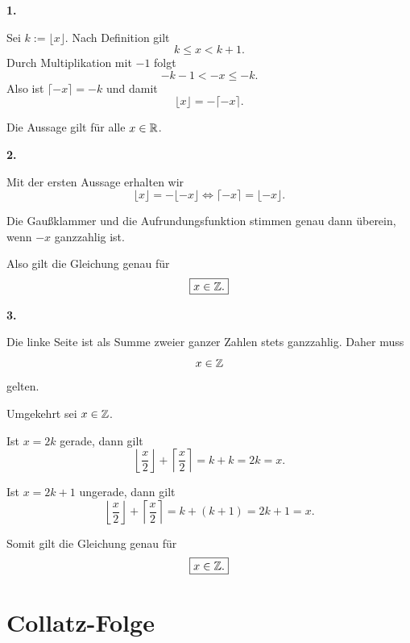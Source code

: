 \documentclass{report}
\begin{document}
\begin{myproof}
  \textbf{1.}

  Sei $k:=\lfloor x\rfloor$. Nach Definition gilt
  \[
    k\le x<k+1.
  \]
  Durch Multiplikation mit $-1$ folgt
  \[
    -k-1<-x\le-k.
  \]
  Also ist $\lceil-x\rceil=-k$ und damit
  \[
    \lfloor x\rfloor=-\lceil-x\rceil.
  \]

  Die Aussage gilt für alle $x\in\mathbb{R}$.

  \medskip
  \textbf{2.}

  Mit der ersten Aussage erhalten wir
  \[
    \lfloor x\rfloor=-\lfloor-x\rfloor
    \iff
    \lceil-x\rceil=\lfloor-x\rfloor.
  \]

  Die Gaußklammer und die Aufrundungsfunktion
  stimmen genau dann überein, wenn $-x$
  ganzzahlig ist.

  Also gilt die Gleichung genau für
  \[
    \boxed{x\in\mathbb{Z}.}
  \]

  \medskip
  \textbf{3.}

  Die linke Seite ist als Summe zweier ganzer
  Zahlen stets ganzzahlig. Daher muss
  \[
    x\in\mathbb{Z}
  \]
  gelten.

  Umgekehrt sei $x\in\mathbb{Z}$.

  Ist $x=2k$ gerade, dann gilt
  \[
    \left\lfloor\frac x2\right\rfloor
    +\left\lceil\frac x2\right\rceil
    =k+k=2k=x.
  \]

  Ist $x=2k+1$ ungerade, dann gilt
  \[
    \left\lfloor\frac x2\right\rfloor
    +\left\lceil\frac x2\right\rceil
    =k+(k+1)=2k+1=x.
  \]

  Somit gilt die Gleichung genau für
  \[
    \boxed{x\in\mathbb{Z}.}
  \]
\end{myproof}


\section{Collatz-Folge}

\end{document}
